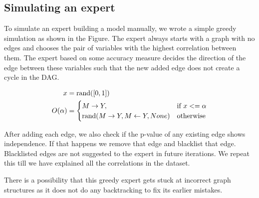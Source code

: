 \documentclass[letterpaper]{article} %
\begin{document}
\subsection{Simulating an expert}
To simulate an expert building a model manually, we wrote a simple greedy simulation as shown in the Figure. The expert always starts with a graph with
no edges and chooses the pair of variables with the highest correlation between them. The expert based on some accuracy measure decides the direction
of the edge between these variables such that the new added edge does not create a cycle in the DAG.


\begin{equation}
	\begin{split}
		x &= \textnormal{rand}([0, 1]) \\
		O(\alpha) &= \begin{cases} 
			M \rightarrow Y, & \textnormal{if  } x <= \alpha \\
			\textnormal{rand}(M \rightarrow Y, M \leftarrow Y, None) & \textnormal{otherwise} \\
				\end{cases} \\
	\end{split}
\end{equation}

% 

After adding each edge, we also check if the p-value of any existing edge shows independence. If that happens we remove that edge and blacklist that edge. 
Blacklisted edges are not suggested to the expert in future iterations. We repeat this till we have explained all the correlations in the dataset.

There is a possibility that this greedy expert gets stuck at incorrect graph structures as it does not do any backtracking to fix its earlier mistakes.
\end{document}
